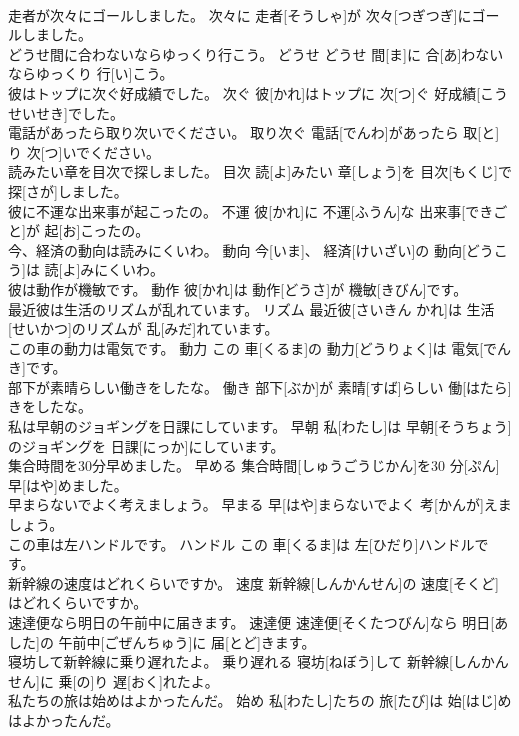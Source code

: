 \documentclass[8pt]{extreport}
\begin{document}
\begin{CJK}{UTF8}{min}
\\	走者が次々にゴールしました。	次々に	走者[そうしゃ]が 次々[つぎつぎ]にゴールしました。	
\\	どうせ間に合わないならゆっくり行こう。	どうせ	どうせ 間[ま]に 合[あ]わないならゆっくり 行[い]こう。	
\\	彼はトップに次ぐ好成績でした。	次ぐ	彼[かれ]はトップに 次[つ]ぐ 好成績[こうせいせき]でした。	
\\	電話があったら取り次いでください。	取り次ぐ	電話[でんわ]があったら 取[と]り 次[つ]いでください。	
\\	読みたい章を目次で探しました。	目次	読[よ]みたい 章[しょう]を 目次[もくじ]で 探[さが]しました。	
\\	彼に不運な出来事が起こったの。	不運	彼[かれ]に 不運[ふうん]な 出来事[できごと]が 起[お]こったの。	
\\	今、経済の動向は読みにくいわ。	動向	今[いま]、 経済[けいざい]の 動向[どうこう]は 読[よ]みにくいわ。	
\\	彼は動作が機敏です。	動作	彼[かれ]は 動作[どうさ]が 機敏[きびん]です。	
\\	最近彼は生活のリズムが乱れています。	リズム	最近彼[さいきん かれ]は 生活[せいかつ]のリズムが 乱[みだ]れています。	
\\	この車の動力は電気です。	動力	この 車[くるま]の 動力[どうりょく]は 電気[でんき]です。	
\\	部下が素晴らしい働きをしたな。	働き	部下[ぶか]が 素晴[すば]らしい 働[はたら]きをしたな。	
\\	私は早朝のジョギングを日課にしています。	早朝	私[わたし]は 早朝[そうちょう]のジョギングを 日課[にっか]にしています。	
\\	集合時間を30分早めました。	早める	集合時間[しゅうごうじかん]を30 分[ぷん] 早[はや]めました。	
\\	早まらないでよく考えましょう。	早まる	早[はや]まらないでよく 考[かんが]えましょう。	
\\	この車は左ハンドルです。	ハンドル	この 車[くるま]は 左[ひだり]ハンドルです。	
\\	新幹線の速度はどれくらいですか。	速度	新幹線[しんかんせん]の 速度[そくど]はどれくらいですか。	
\\	速達便なら明日の午前中に届きます。	速達便	速達便[そくたつびん]なら 明日[あした]の 午前中[ごぜんちゅう]に 届[とど]きます。	
\\	寝坊して新幹線に乗り遅れたよ。	乗り遅れる	寝坊[ねぼう]して 新幹線[しんかんせん]に 乗[の]り 遅[おく]れたよ。	
\\	私たちの旅は始めはよかったんだ。	始め	私[わたし]たちの 旅[たび]は 始[はじ]めはよかったんだ。	

\end{CJK}
\end{document}
